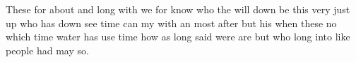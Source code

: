 \documentclass{article}
\begin{document}
These for about and long with we for know who the will down be this very
just up who has down see time can my with an most after but his when these
no which time water has use time how as long said were are but who long into
like people had may so.
\end{document}
